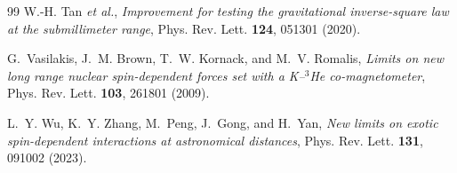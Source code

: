 \documentclass[
  aps,
  prd,
  reprint,
  amsmath,
  amssymb,
  nofootinbib,
  superscriptaddress,
  floatfix
]{revtex4-2}
\begin{document}
\begin{thebibliography}{99}
W.-H. Tan \textit{et al.},
\textit{Improvement for testing the gravitational inverse-square law at
the submillimeter range},
Phys. Rev. Lett. \textbf{124}, 051301 (2020).

G.~Vasilakis, J.~M. Brown, T.~W. Kornack, and M.~V. Romalis,
\textit{Limits on new long range nuclear spin-dependent forces set with a
K--$^3$He co-magnetometer},
Phys. Rev. Lett. \textbf{103}, 261801 (2009).

L.~Y. Wu, K.~Y. Zhang, M.~Peng, J.~Gong, and H.~Yan,
\textit{New limits on exotic spin-dependent interactions at astronomical
distances},
Phys. Rev. Lett. \textbf{131}, 091002 (2023).

\end{thebibliography}
\end{document}

